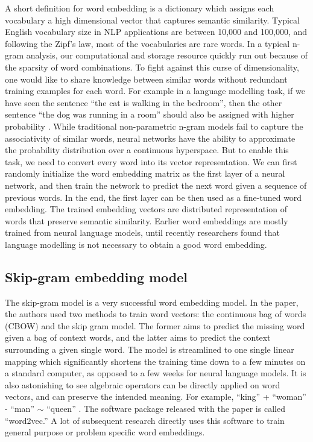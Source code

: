 A short definition for word embedding is a dictionary which assigns each vocabulary a high dimensional vector that captures semantic similarity. Typical English vocabulary size in NLP applications are between 10,000 and 100,000, and following the Zipf's law\cite{zipf49}, most of the vocabularies are rare words. In a typical n-gram analysis, our computational and storage resource quickly run out because of the sparsity of word combinations. To fight against this curse of dimensionality, one would like to share knowledge between similar words without redundant training examples for each word. For example in a language modelling task, if we have seen the sentence ``the cat is walking in the bedroom'', then the other sentence ``the dog was running in a room'' should also be assigned with higher probability \cite{bengio03}. While traditional non-parametric n-gram models fail to capture the associativity of similar words, neural networks have the ability to approximate the probability distribution over a continuous hyperspace. But to enable this task, we need to convert every word into its vector representation. We can first randomly initialize the word embedding matrix as the first layer of a neural network, and then train the network to predict the next word given a sequence of previous words. In the end, the first layer can be then used as a fine-tuned word embedding. The trained embedding vectors are distributed representation of words that preserve semantic similarity. Earlier word embeddings are mostly trained from neural language models, until recently researchers found that language modelling is not necessary to obtain a good word embedding.

\subsection{Skip-gram embedding model}
The skip-gram model \cite{mikolov13} is a very successful word embedding model. In the paper, the authors used two methods to train word vectors: the continuous bag of words (CBOW) and the skip gram model. The former aims to predict the missing word given a bag of context words, and the latter aims to predict the context surrounding a given single word. The model is streamlined to one single linear mapping which significantly shortens the training time down to a few minutes on a standard computer, as opposed to a few weeks for neural language models. It is also astonishing to see algebraic operators can be directly applied on word vectors, and can preserve the intended meaning. For example, ``king'' + 	``woman'' - ``man'' $\sim$ ``queen'' \cite{mikolov13}. The software package released with the paper is called ``word2vec.'' A lot of subsequent research directly uses this software to train general purpose or problem specific word embeddings.

